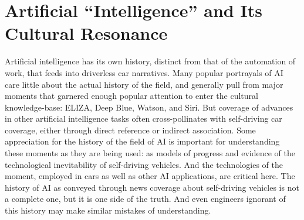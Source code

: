 \section{Artificial ``Intelligence'' and Its Cultural Resonance}
Artificial intelligence has its own history, distinct from that of the
automation of work, that feeds into driverless car narratives. Many popular
portrayals of AI care little about the actual history of the field,
and generally pull from major moments that garnered enough popular
attention to enter the cultural knowledge-base: ELIZA, Deep Blue,
Watson, and Siri. But coverage of advances in other artificial
intelligence tasks often cross-pollinates with self-driving car
coverage, either through direct reference or indirect association.
Some appreciation for the history of the field
of AI is important for understanding these moments as they are being
used:  as models of progress and evidence of the technological inevitability of
self-driving vehicles. And the technologies of the moment, employed in
cars as well as other AI applications, are critical here. The history
of AI as conveyed through news coverage about self-driving vehicles is
not a complete one, but it is one side of the truth. And even
engineers ignorant of this history may make similar mistakes of understanding.



